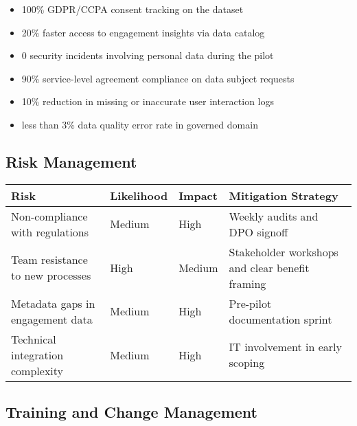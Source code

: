 \documentclass[11pt,a4paper,computermodern]{article}
\begin{document}
\begin{itemize}[itemsep=5pt, parsep=0pt]
	\item 100\% GDPR/CCPA consent tracking on the dataset
	\item 20\% faster access to engagement insights via data catalog
	\item 0 security incidents involving personal data during the pilot
	\item 90\% service-level agreement compliance on data subject requests
	\item 10\% reduction in missing or inaccurate user interaction logs
	\item less than 3\% data quality error rate in governed domain
\end{itemize}


\subsection*{Risk Management}

\begin{table}[h]
	\centering
	\begin{threeparttable}
		\label{table:risks}
		\begin{tabularx}{0.99\textwidth}{>{\centering\arraybackslash}X >{\centering\arraybackslash}X >{\centering\arraybackslash}X >{\centering\arraybackslash}X}
			\toprule
			Risk & Likelihood & Impact & Mitigation Strategy \\
			\midrule
			Non-compliance with regulations & Medium & High & Weekly audits and DPO signoff \\
			Team resistance to new processes & High & Medium & Stakeholder workshops and clear benefit framing \\
			Metadata gaps in engagement data & Medium & High & Pre-pilot documentation sprint \\
			Technical integration complexity & Medium & High & IT involvement in early scoping \\
			\bottomrule
		\end{tabularx}
	\end{threeparttable}
\end{table}


\subsection*{Training and Change Management}
\end{document}
